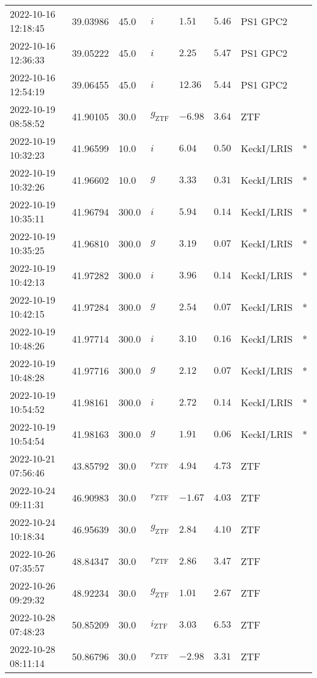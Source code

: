 \documentclass{nature_plusfigure}
\begin{document}
\begin{supplement}
\begin{center}
\begin{longtable}{llllllll}
2022-10-16 12:18:45 & 39.03986 & 45.0 & $i$ & $1.51$ & $5.46$ & PS1 GPC2 &  \\ 
2022-10-16 12:36:33 & 39.05222 & 45.0 & $i$ & $2.25$ & $5.47$ & PS1 GPC2 &  \\ 
2022-10-16 12:54:19 & 39.06455 & 45.0 & $i$ & $12.36$ & $5.44$ & PS1 GPC2 &  \\ 
2022-10-19 08:58:52 & 41.90105 & 30.0 & ${g}_\mathrm{ZTF}$ & $-6.98$ & $3.64$ & ZTF &  \\ 
2022-10-19 10:32:23 & 41.96599 & 10.0 & $i$ & $6.04$ & $0.50$ & KeckI/LRIS & * \\ 
2022-10-19 10:32:26 & 41.96602 & 10.0 & $g$ & $3.33$ & $0.31$ & KeckI/LRIS & * \\ 
2022-10-19 10:35:11 & 41.96794 & 300.0 & $i$ & $5.94$ & $0.14$ & KeckI/LRIS & * \\ 
2022-10-19 10:35:25 & 41.96810 & 300.0 & $g$ & $3.19$ & $0.07$ & KeckI/LRIS & * \\ 
2022-10-19 10:42:13 & 41.97282 & 300.0 & $i$ & $3.96$ & $0.14$ & KeckI/LRIS & * \\ 
2022-10-19 10:42:15 & 41.97284 & 300.0 & $g$ & $2.54$ & $0.07$ & KeckI/LRIS & * \\ 
2022-10-19 10:48:26 & 41.97714 & 300.0 & $i$ & $3.10$ & $0.16$ & KeckI/LRIS & * \\ 
2022-10-19 10:48:28 & 41.97716 & 300.0 & $g$ & $2.12$ & $0.07$ & KeckI/LRIS & * \\ 
2022-10-19 10:54:52 & 41.98161 & 300.0 & $i$ & $2.72$ & $0.14$ & KeckI/LRIS & * \\ 
2022-10-19 10:54:54 & 41.98163 & 300.0 & $g$ & $1.91$ & $0.06$ & KeckI/LRIS & * \\ 
2022-10-21 07:56:46 & 43.85792 & 30.0 & ${r}_\mathrm{ZTF}$ & $4.94$ & $4.73$ & ZTF &  \\ 
2022-10-24 09:11:31 & 46.90983 & 30.0 & ${r}_\mathrm{ZTF}$ & $-1.67$ & $4.03$ & ZTF &  \\ 
2022-10-24 10:18:34 & 46.95639 & 30.0 & ${g}_\mathrm{ZTF}$ & $2.84$ & $4.10$ & ZTF &  \\ 
2022-10-26 07:35:57 & 48.84347 & 30.0 & ${r}_\mathrm{ZTF}$ & $2.86$ & $3.47$ & ZTF &  \\ 
2022-10-26 09:29:32 & 48.92234 & 30.0 & ${g}_\mathrm{ZTF}$ & $1.01$ & $2.67$ & ZTF &  \\ 
2022-10-28 07:48:23 & 50.85209 & 30.0 & ${i}_\mathrm{ZTF}$ & $3.03$ & $6.53$ & ZTF &  \\ 
2022-10-28 08:11:14 & 50.86796 & 30.0 & ${r}_\mathrm{ZTF}$ & $-2.98$ & $3.31$ & ZTF &  \\ 

\end{longtable}
\end{center}
\end{supplement}
\end{document}

